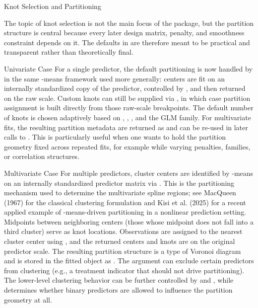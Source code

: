 \begin{Section}{Knot Selection and Partitioning}


The topic of knot selection is not the main focus of the package, but the
partition structure is central because every later design matrix, penalty,
and smoothness constraint depends on it. The defaults in  are
therefore meant to be practical and transparent rather than theoretically
final.

%
\begin{SubSection}{Univariate Case}
For a single predictor, the default partitioning is now handled by
 in the same -means framework used more
generally:  centers are fit on an internally standardized copy
of the predictor, controlled by , and
then returned on the raw scale. Custom knots can still be supplied via
, in which case partition assignment is built directly
from those raw-scale breakpoints. The default number of knots  is
chosen adaptively based on , , , and the GLM family.
For multivariate fits, the resulting partition metadata are returned as
 and can be re-used in later calls to
. This is particularly useful when one wants to hold
the partition geometry fixed across repeated fits, for example while varying
penalties, families, or correlation structures.
\end{SubSection}

%
\begin{SubSection}{Multivariate Case}
For multiple predictors,  cluster centers are identified by
-means on an internally standardized predictor matrix via
. This is the partitioning mechanism used to
determine the multivariate spline regions; see MacQueen (1967) for the
classical clustering formulation and Kisi et al. (2025) for a recent applied
example of -means-driven partitioning in a nonlinear prediction
setting. Midpoints between neighboring centers
(those whose midpoint  does not fall into a third cluster) serve as knot
locations. Observations are assigned to the nearest cluster center using
, and the returned centers and knots are on
the original predictor scale. The resulting partition structure is a type
of Voronoi diagram and is stored in the fitted object as
. The  argument can
exclude certain predictors from clustering (e.g., a treatment indicator that
should not drive partitioning). The lower-level clustering behavior can be
further controlled by  and ,
while  determines whether binary predictors are
allowed to influence the partition geometry at all.
\end{SubSection}



\end{Section}
